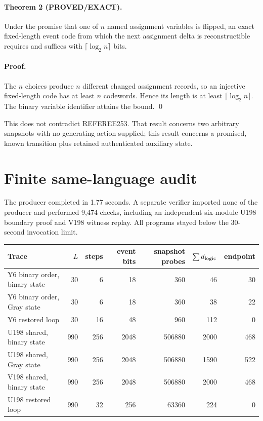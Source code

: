 \documentclass[11pt]{article}
\newcommand{\status}[1]{\textsf{#1}}
\begin{document}
\paragraph{Theorem 2 (\status{PROVED/EXACT}).}
Under the promise that one of $n$ named assignment variables is flipped, an exact fixed-length event code from which the next assignment delta is reconstructible requires and suffices with $\lceil\log_2n\rceil$ bits.

\paragraph{Proof.}
The $n$ choices produce $n$ different changed assignment records, so an injective fixed-length code has at least $n$ codewords.  Hence its length is at least $\lceil\log_2n\rceil$.  The binary variable identifier attains the bound. \qed

This does not contradict REFEREE253.  That result concerns two arbitrary snapshots with no generating action supplied; this result concerns a promised, known transition plus retained authenticated auxiliary state.

\section{Finite same-language audit}
The producer completed in 1.77 seconds.  A separate verifier imported none of the producer and performed 9,474 checks, including an independent six-module U198 boundary proof and V198 witness replay.  All programs stayed below the 30-second invocation limit.

\begin{center}
\begin{tabular}{lrrrrrr}
\toprule
Trace & $L$ & steps & event bits & snapshot probes & $\sum d_{\rm logic}$ & endpoint\\
\midrule
Y6 binary order, binary state & 30 & 6 & 18 & 360 & 46 & 30\\
Y6 binary order, Gray state & 30 & 6 & 18 & 360 & 38 & 22\\
Y6 restored loop & 30 & 16 & 48 & 960 & 112 & 0\\
U198 shared, binary state & 990 & 256 & 2048 & 506880 & 2000 & 468\\
U198 shared, Gray state & 990 & 256 & 2048 & 506880 & 1590 & 522\\
V198 shared, binary state & 990 & 256 & 2048 & 506880 & 2000 & 468\\
U198 restored loop & 990 & 32 & 256 & 63360 & 224 & 0\\
\bottomrule
\end{tabular}
\end{center}
\end{document}
